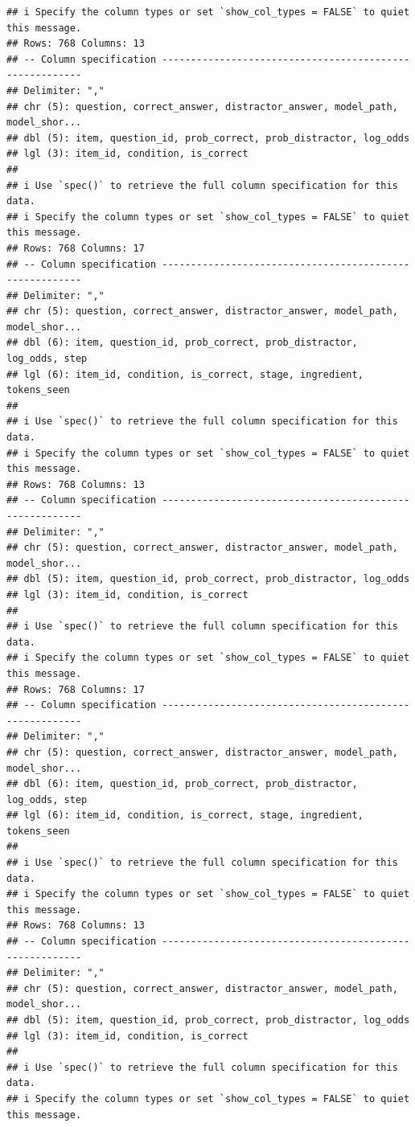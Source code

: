 \documentclass[
]{article}
\begin{document}
\begin{verbatim}
## i Specify the column types or set `show_col_types = FALSE` to quiet this message.
## Rows: 768 Columns: 13
## -- Column specification --------------------------------------------------------
## Delimiter: ","
## chr (5): question, correct_answer, distractor_answer, model_path, model_shor...
## dbl (5): item, question_id, prob_correct, prob_distractor, log_odds
## lgl (3): item_id, condition, is_correct
## 
## i Use `spec()` to retrieve the full column specification for this data.
## i Specify the column types or set `show_col_types = FALSE` to quiet this message.
## Rows: 768 Columns: 17
## -- Column specification --------------------------------------------------------
## Delimiter: ","
## chr (5): question, correct_answer, distractor_answer, model_path, model_shor...
## dbl (6): item, question_id, prob_correct, prob_distractor, log_odds, step
## lgl (6): item_id, condition, is_correct, stage, ingredient, tokens_seen
## 
## i Use `spec()` to retrieve the full column specification for this data.
## i Specify the column types or set `show_col_types = FALSE` to quiet this message.
## Rows: 768 Columns: 13
## -- Column specification --------------------------------------------------------
## Delimiter: ","
## chr (5): question, correct_answer, distractor_answer, model_path, model_shor...
## dbl (5): item, question_id, prob_correct, prob_distractor, log_odds
## lgl (3): item_id, condition, is_correct
## 
## i Use `spec()` to retrieve the full column specification for this data.
## i Specify the column types or set `show_col_types = FALSE` to quiet this message.
## Rows: 768 Columns: 17
## -- Column specification --------------------------------------------------------
## Delimiter: ","
## chr (5): question, correct_answer, distractor_answer, model_path, model_shor...
## dbl (6): item, question_id, prob_correct, prob_distractor, log_odds, step
## lgl (6): item_id, condition, is_correct, stage, ingredient, tokens_seen
## 
## i Use `spec()` to retrieve the full column specification for this data.
## i Specify the column types or set `show_col_types = FALSE` to quiet this message.
## Rows: 768 Columns: 13
## -- Column specification --------------------------------------------------------
## Delimiter: ","
## chr (5): question, correct_answer, distractor_answer, model_path, model_shor...
## dbl (5): item, question_id, prob_correct, prob_distractor, log_odds
## lgl (3): item_id, condition, is_correct
## 
## i Use `spec()` to retrieve the full column specification for this data.
## i Specify the column types or set `show_col_types = FALSE` to quiet this message.

\end{verbatim}
\end{document}
